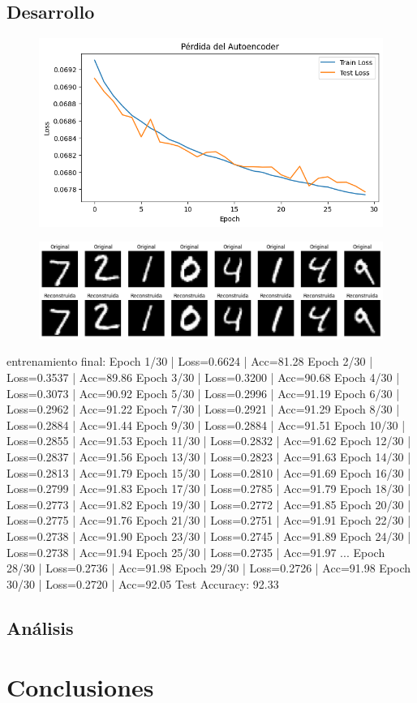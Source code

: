 \documentclass[11pt]{article} %
\begin{document}
\subsection{Desarrollo}

\begin{figure}[h!]
	\centering
	\includegraphics[width=0.7\linewidth]{imgs/ej7_loss}
	\caption{}
	\label{fig:ej7loss}
\end{figure}

\begin{figure}[h!]
	\centering
	\includegraphics[width=0.7\linewidth]{imgs/ej7_reconstr_digitos}
	\caption{}
	\label{fig:ej7reconstrdigitos}
\end{figure}

entrenamiento final:
Epoch 1/30 | Loss=0.6624 | Acc=81.28%
Epoch 2/30 | Loss=0.3537 | Acc=89.86%
Epoch 3/30 | Loss=0.3200 | Acc=90.68%
Epoch 4/30 | Loss=0.3073 | Acc=90.92%
Epoch 5/30 | Loss=0.2996 | Acc=91.19%
Epoch 6/30 | Loss=0.2962 | Acc=91.22%
Epoch 7/30 | Loss=0.2921 | Acc=91.29%
Epoch 8/30 | Loss=0.2884 | Acc=91.44%
Epoch 9/30 | Loss=0.2884 | Acc=91.51%
Epoch 10/30 | Loss=0.2855 | Acc=91.53%
Epoch 11/30 | Loss=0.2832 | Acc=91.62%
Epoch 12/30 | Loss=0.2837 | Acc=91.56%
Epoch 13/30 | Loss=0.2823 | Acc=91.63%
Epoch 14/30 | Loss=0.2813 | Acc=91.79%
Epoch 15/30 | Loss=0.2810 | Acc=91.69%
Epoch 16/30 | Loss=0.2799 | Acc=91.83%
Epoch 17/30 | Loss=0.2785 | Acc=91.79%
Epoch 18/30 | Loss=0.2773 | Acc=91.82%
Epoch 19/30 | Loss=0.2772 | Acc=91.85%
Epoch 20/30 | Loss=0.2775 | Acc=91.76%
Epoch 21/30 | Loss=0.2751 | Acc=91.91%
Epoch 22/30 | Loss=0.2738 | Acc=91.90%
Epoch 23/30 | Loss=0.2745 | Acc=91.89%
Epoch 24/30 | Loss=0.2738 | Acc=91.94%
Epoch 25/30 | Loss=0.2735 | Acc=91.97%
...
Epoch 28/30 | Loss=0.2736 | Acc=91.98%
Epoch 29/30 | Loss=0.2726 | Acc=91.98%
Epoch 30/30 | Loss=0.2720 | Acc=92.05%
Test Accuracy: 92.33%




\subsection{Análisis}

\clearpage


\section{Conclusiones}
\end{document}
